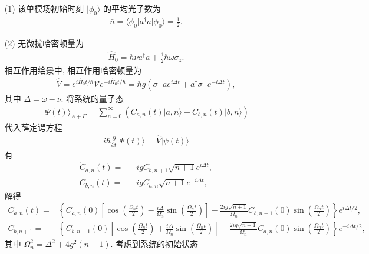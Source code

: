 \documentclass{assignment}
\begin{document}
\begin{sol}
    \begin{itemize}
        \item[(1)] 该单模场初始时刻 $\lvert\phi_0\rangle$ 的平均光子数为
        \begin{align}
            \bar{n}=\langle\phi_0\rvert a^{\dagger}a\lvert\phi_0\rangle=\frac{1}{2}.
        \end{align}
        \item[(2)] 无微扰哈密顿量为
        \begin{align}
            \hat{H}_0=\hbar\nu a^{\dagger}a+\frac{1}{2}\hbar\omega\sigma_z.
        \end{align}
        相互作用绘景中, 相互作用哈密顿量为
        \begin{align}
            \hat{V}=e^{i\hat{H}_0t/\hbar}\mathscr{V}e^{-i\hat{H}_0t/\hbar}=\hbar g(\sigma_+ae^{i\Delta t}+a^{\dagger}\sigma_-e^{-i\Delta t}),
        \end{align}
        其中 $\Delta=\omega-\nu$.
        将系统的量子态
        \begin{align}
            \lvert\Psi(t)\rangle_{A+F}=\sum_{n=0}^{\infty}(C_{a,n}(t)\lvert a,n\rangle+C_{b,n}(t)\lvert b,n\rangle)
        \end{align}
        代入薛定谔方程
        \begin{align}
            i\hbar\frac{\partial}{\partial t}\lvert\Psi(t)\rangle=\hat{V}\lvert\psi(t)\rangle
        \end{align}
        有
        \begin{align}
            \dot{C}_{a,n}(t)=&-igC_{b,n+1}\sqrt{n+1}e^{i\Delta t},\\
            \dot{C}_{b,n}(t)=&-igC_{a,n}\sqrt{n+1}e^{-i\Delta t},
        \end{align}
        解得
        \begin{align}
            C_{a,n}(t)=&\left\{C_{a,n}(0)\left[\cos\left(\frac{\Omega_nt}{2}\right)-\frac{i\Delta}{\Omega_n}\sin\left(\frac{\Omega_nt}{2}\right)\right]-\frac{2ig\sqrt{n+1}}{\Omega_n}C_{b,n+1}(0)\sin\left(\frac{\Omega_nt}{2}\right)\right\}e^{i\Delta t/2},\\
            C_{b,n+1}=&\left\{C_{b,n+1}(0)\left[\cos\left(\frac{\Omega_nt}{2}\right)+\frac{i\Delta}{\Omega_n}\sin\left(\frac{\Omega_nt}{2}\right)\right]-\frac{2ig\sqrt{n+1}}{\Omega_n}C_{a,n}(0)\sin\left(\frac{\Omega_nt}{2}\right)\right\}e^{-i\Delta t/2},
        \end{align}
        其中 $\Omega_n^2=\Delta^2+4g^2(n+1)$.
        考虑到系统的初始状态

\end{itemize}
\end{sol}
\end{document}

